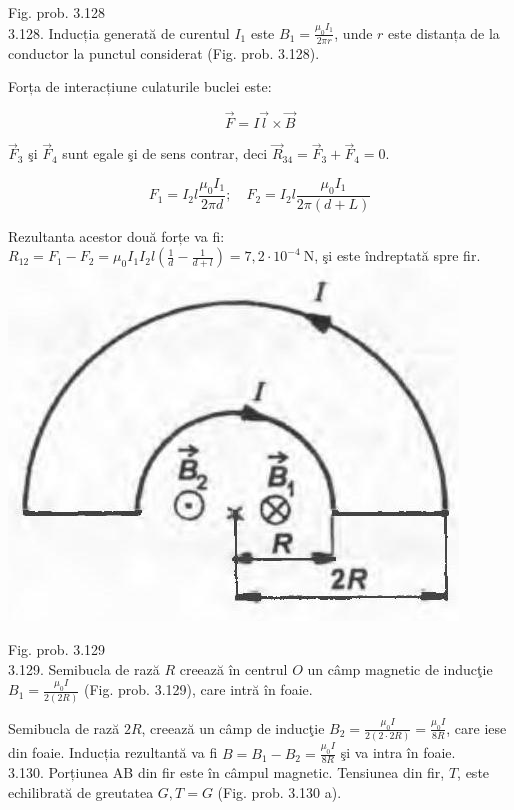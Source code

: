\documentclass[10pt]{article}
\begin{document}
Fig. prob. 3.128\\
3.128. Inducția generată de curentul $I_{1}$ este $B_{1}=\frac{\mu_{0} I_{1}}{2 \pi r}$, unde $r$ este distanța de la conductor la punctul considerat (Fig. prob. 3.128).

Forța de interacțiune culaturile buclei este:

$$
\vec{F}=I \vec{l} \times \vec{B}
$$

$\vec{F}_{3}$ şi $\vec{F}_{4}$ sunt egale şi de sens contrar, deci $\vec{R}_{34}=\vec{F}_{3}+\vec{F}_{4}=0$.

$$
F_{1}=I_{2} l \frac{\mu_{0} I_{1}}{2 \pi d} ; \quad F_{2}=I_{2} l \frac{\mu_{0} I_{1}}{2 \pi(d+L)}
$$

Rezultanta acestor două forțe va fi:\\
$R_{12}=F_{1}-F_{2}=\mu_{0} I_{1} I_{2} l\left(\frac{1}{d}-\frac{1}{d+l}\right)=7,2 \cdot 10^{-4} \mathrm{~N}$, şi este îndreptată spre fir.\\
\includegraphics[max width=\textwidth, center]{2025_07_01_5b3ff9fa0d508c8e9f17g-366(1)}

Fig. prob. 3.129\\
3.129. Semibucla de rază $R$ creează în centrul $O$ un câmp magnetic de inducţie $B_{1}=\frac{\mu_{0} I}{2(2 R)}$ (Fig. prob. 3.129), care intră în foaie.

Semibucla de rază $2 R$, creează un câmp de inducţie $B_{2}=\frac{\mu_{0} I}{2(2 \cdot 2 R)}=\frac{\mu_{0} I}{8 R}$, care iese din foaie. Inducția rezultantă va fi $B=B_{1}-B_{2}=\frac{\mu_{0} I}{8 R}$ şi va intra în foaie.\\
3.130. Porțiunea AB din fir este în câmpul magnetic. Tensiunea din fir, $T$, este echilibrată de greutatea $G, T=G$ (Fig. prob. 3.130 a).
\end{document}

